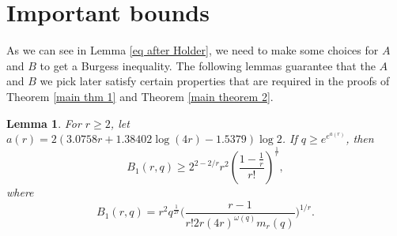 \documentclass[12pt]{amsart}
\theoremstyle{plain}
\newtheorem{lemma}[theorem]{Lemma}
\newtheorem{proposition}[theorem]{Proposition}
\theoremstyle{definition}
\newcommand{\cA}{{\mathcal{A}}}
\renewcommand{\pmod}[1]{{\ifmmode\text{\rm\ (mod~$#1$)}\else\discretionary{}{}{\hbox{ }}\rm(mod~$#1$)\fi}}
\begin{document}



\section{Important bounds}\label{section asymptotics}
As we can see in Lemma \ref{eq after Holder}, we need to make some choices for $A$ and $B$ to get a Burgess inequality. The following lemmas guarantee that the $A$ and $B$ we pick later satisfy certain properties that are required in the proofs of Theorem \ref{main thm 1} and Theorem \ref{main theorem 2}.

\begin{lemma} \label{B will be at least 10 if it kills us lemma}
For $r\ge 2$, let $a(r) = 2\left(3.0758r+1.38402\log(4r)-1.5379\right)\log{2}$. If $q \ge e^{e^{a(r)}}$, then $$B_1(r,q)\ge 2^{2-2/r}r^2\left(\frac{1-\frac{1}{r}}{r!}\right)^{\frac{1}{r}},$$
where 
\begin{equation}\label{def B_1}
B_1(r,q) = r^2q^{\frac{1}{2r}}\biggl( \frac{r-1}{r!2r(4r)^{\omega(q)}m_r(q)} \biggr)^{1/r}.
\end{equation}
\end{lemma}
 
\end{document}
